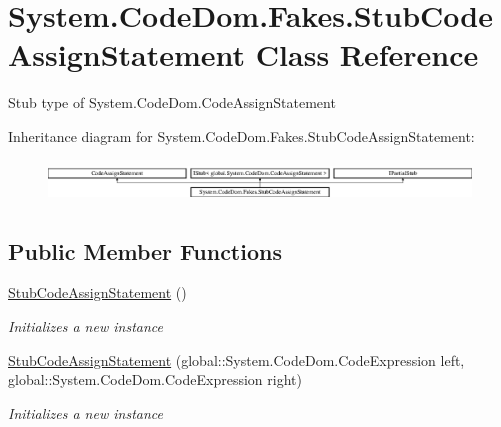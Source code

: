 \hypertarget{class_system_1_1_code_dom_1_1_fakes_1_1_stub_code_assign_statement}{\section{System.\-Code\-Dom.\-Fakes.\-Stub\-Code\-Assign\-Statement Class Reference}
\label{class_system_1_1_code_dom_1_1_fakes_1_1_stub_code_assign_statement}
}


Stub type of System.\-Code\-Dom.\-Code\-Assign\-Statement 


Inheritance diagram for System.\-Code\-Dom.\-Fakes.\-Stub\-Code\-Assign\-Statement\-:\begin{figure}[H]
\begin{center}
\leavevmode
\includegraphics[height=1.114428cm]{class_system_1_1_code_dom_1_1_fakes_1_1_stub_code_assign_statement}
\end{center}
\end{figure}
\subsection*{Public Member Functions}
\begin{DoxyCompactItemize}
\item 
\hyperlink{class_system_1_1_code_dom_1_1_fakes_1_1_stub_code_assign_statement_a177daf731bf7f03919815e65c2109642}{Stub\-Code\-Assign\-Statement} ()
\begin{DoxyCompactList}\small\item\em Initializes a new instance\end{DoxyCompactList}\item 
\hyperlink{class_system_1_1_code_dom_1_1_fakes_1_1_stub_code_assign_statement_a28688dcdcc5d481ce4e40c4c53685d37}{Stub\-Code\-Assign\-Statement} (global\-::\-System.\-Code\-Dom.\-Code\-Expression left, global\-::\-System.\-Code\-Dom.\-Code\-Expression right)
\begin{DoxyCompactList}\small\item\em Initializes a new instance\end{DoxyCompactList}\end{DoxyCompactItemize}
